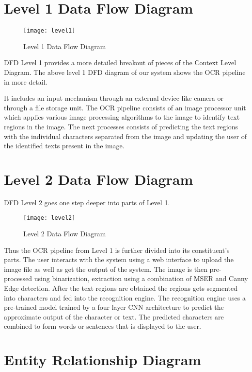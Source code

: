 \section{Level 1 Data Flow Diagram}

\begin{figure}[htb]
\centering
\texttt{[image: level1]}
\caption{Level 1 Data Flow Diagram}
\end{figure}


DFD Level 1 provides a more detailed breakout of pieces of the Context Level Diagram. The above level 1 DFD diagram of our system shows the OCR pipeline in more detail.

It includes an input mechanism through an external device like camera or through a file storage unit. The OCR pipeline consists of an image processor unit which applies various image processing algorithms to the image to identify text regions in the image. The next processes consists of predicting the text regions with the individual characters separated from the image and updating the user of the identified texts present in the image. 



\section{Level 2 Data Flow Diagram}

DFD Level 2 goes one step deeper into parts of Level 1. 

\begin{figure}[htb]
\centering
\texttt{[image: level2]}
\caption{Level 2 Data Flow Diagram}
\end{figure}

Thus the OCR pipeline from Level 1 is further divided into its constituent’s parts. The user interacts with the system using a web interface to upload the image file as well as get the output of the system. The image is then pre-processed using binarization, extraction using a combination of MSER and Canny Edge detection. After the text regions are obtained the regions gets segmented into characters and fed into the recognition engine. The recognition engine uses a pre-trained model trained by a four layer CNN architecture to predict the approximate output of the character or text. The predicted characters are combined to form words or sentences that is displayed to the user.

\section{Entity Relationship Diagram}

